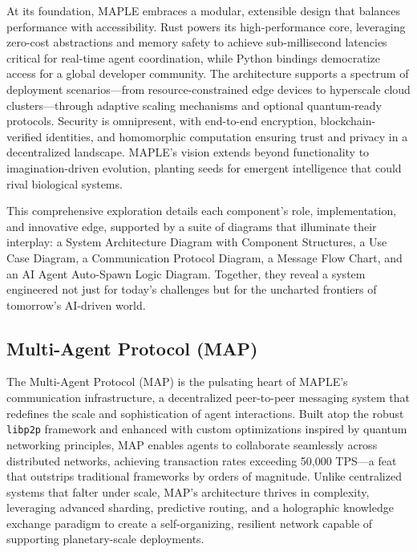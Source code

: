 \documentclass[a4paper,11pt]{article}
\begin{document}
At its foundation, MAPLE embraces a modular, extensible design that balances performance with accessibility. Rust powers its high-performance core, leveraging zero-cost abstractions and memory safety to achieve sub-millisecond latencies critical for real-time agent coordination, while Python bindings democratize access for a global developer community. The architecture supports a spectrum of deployment scenarios—from resource-constrained edge devices to hyperscale cloud clusters—through adaptive scaling mechanisms and optional quantum-ready protocols. Security is omnipresent, with end-to-end encryption, blockchain-verified identities, and homomorphic computation ensuring trust and privacy in a decentralized landscape. MAPLE’s vision extends beyond functionality to imagination-driven evolution, planting seeds for emergent intelligence that could rival biological systems.

This comprehensive exploration details each component’s role, implementation, and innovative edge, supported by a suite of diagrams that illuminate their interplay: a System Architecture Diagram with Component Structures, a Use Case Diagram, a Communication Protocol Diagram, a Message Flow Chart, and an AI Agent Auto-Spawn Logic Diagram. Together, they reveal a system engineered not just for today’s challenges but for the uncharted frontiers of tomorrow’s AI-driven world.

\subsection{Multi-Agent Protocol (MAP)}
The Multi-Agent Protocol (MAP) is the pulsating heart of MAPLE’s communication infrastructure, a decentralized peer-to-peer messaging system that redefines the scale and sophistication of agent interactions. Built atop the robust \texttt{libp2p} framework and enhanced with custom optimizations inspired by quantum networking principles, MAP enables agents to collaborate seamlessly across distributed networks, achieving transaction rates exceeding 50,000 TPS—a feat that outstrips traditional frameworks by orders of magnitude. Unlike centralized systems that falter under scale, MAP’s architecture thrives in complexity, leveraging advanced sharding, predictive routing, and a holographic knowledge exchange paradigm to create a self-organizing, resilient network capable of supporting planetary-scale deployments.
\end{document}
